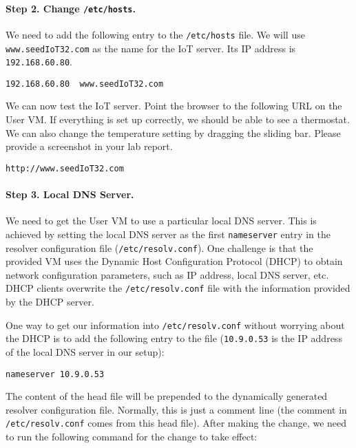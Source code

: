 \paragraph{Step 2. Change \texttt{/etc/hosts}.}
We need to add the following entry to the \texttt{/etc/hosts} file. 
We will use \texttt{www.seedIoT32.com} as the name for the 
IoT server. Its IP address is \texttt{192.168.60.80}. 

\begin{lstlisting}
192.168.60.80  www.seedIoT32.com
\end{lstlisting}


We can now test the IoT server. Point the browser to the following URL on the 
User VM. If everything is set up correctly, we should be able to see 
a thermostat. We can also change the temperature setting by dragging the 
sliding bar. Please provide a screenshot in your lab report. 

\begin{lstlisting}
http://www.seedIoT32.com
\end{lstlisting}
 


\paragraph{Step 3. Local DNS Server.}
We need to get the User VM to use a particular local DNS server. This is achieved by
setting the local DNS server as the first \texttt{nameserver} entry in the resolver
configuration file (\texttt{/etc/resolv.conf}). 
One challenge is that the provided VM uses the
Dynamic Host Configuration Protocol (DHCP) to obtain network configuration parameters, such as
IP address, local DNS server, etc. DHCP clients overwrite the \texttt{/etc/resolv.conf}
file with the information provided by the DHCP server.

One way to get our information into \texttt{/etc/resolv.conf} without worrying about
the DHCP is to add the following entry to the 
file (\texttt{10.9.0.53} is the IP address of the local DNS server in our setup):

\begin{lstlisting}
nameserver 10.9.0.53
\end{lstlisting}

The content of the head file will be prepended to the dynamically generated resolver
configuration file. Normally, this is just a comment line (the comment in
\texttt{/etc/resolv.conf} comes from this head file). After making the change,
we need to run the following command for the change to take effect: 

